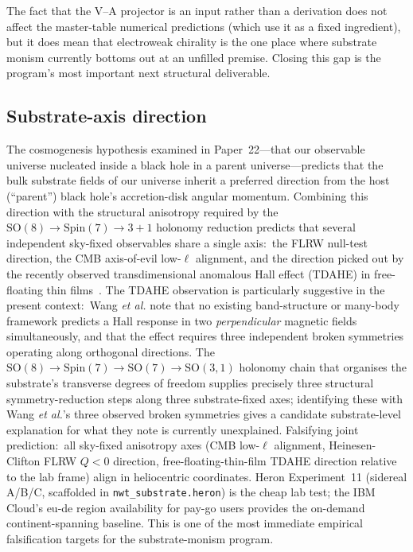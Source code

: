 \documentclass[11pt]{article}
\begin{document}
The fact that the V--A projector is an input rather than a
derivation does not affect the master-table numerical predictions
(which use it as a fixed ingredient), but it does mean that
electroweak chirality is the one place where substrate monism
currently bottoms out at an unfilled premise.  Closing this gap
is the program's most important next structural deliverable.

\subsection{Substrate-axis direction}
\label{sec:open-substrate-axis}

The cosmogenesis hypothesis examined in Paper~22---that our
observable universe nucleated inside a black hole in a parent
universe---predicts that the bulk substrate fields of our
universe inherit a preferred direction from the host (``parent'')
black hole's accretion-disk angular momentum.  Combining this
direction with the structural anisotropy required by the
$\mathrm{SO}(8)\to\mathrm{Spin}(7)\to{3{+}1}$ holonomy reduction
predicts that several independent sky-fixed observables share a
single axis:\ the FLRW null-test direction, the CMB
axis-of-evil low-$\ell$ alignment, and the direction picked out
by the recently observed transdimensional anomalous Hall effect
(TDAHE) in free-floating thin films~\cite{wang2026tdahe}.
The TDAHE observation is particularly suggestive in the present
context:\ Wang \emph{et al.} note that no existing band-structure
or many-body framework predicts a Hall response in two
\emph{perpendicular} magnetic fields simultaneously, and that
the effect requires three independent broken symmetries
operating along orthogonal directions.  The
$\mathrm{SO}(8) \to \mathrm{Spin}(7) \to \mathrm{SO}(7)
\to \mathrm{SO}(3,1)$ holonomy chain that organises the
substrate's transverse degrees of freedom supplies precisely
three structural symmetry-reduction steps along three
substrate-fixed axes; identifying these with Wang \emph{et al.}'s
three observed broken symmetries gives a candidate
substrate-level explanation for what they note is currently
unexplained.  Falsifying joint prediction:\ all sky-fixed anisotropy
axes (CMB low-$\ell$ alignment, Heinesen-Clifton FLRW
$Q < 0$ direction, free-floating-thin-film TDAHE direction
relative to the lab frame) align in heliocentric coordinates.
Heron Experiment~11 (sidereal A/B/C, scaffolded in
\texttt{nwt\_substrate.heron}) is the cheap lab test; the IBM
Cloud's eu-de region availability for pay-go users provides the
on-demand continent-spanning baseline.  This is one of the most
immediate empirical falsification targets for the substrate-monism
program.
\end{document}

